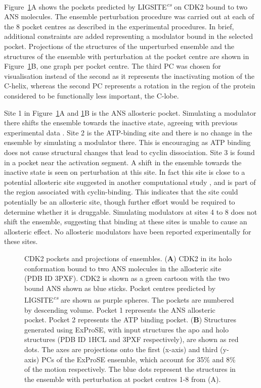 Figure~\ref{fig:cdk}A shows the pockets predicted by LIGSITE\textsuperscript{\it cs} \cite{Huang2006} on CDK2 bound to two ANS molecules.
The ensemble perturbation procedure was carried out at each of the 8 pocket centres as described in the experimental procedures.
In brief, additional constraints are added representing a modulator bound in the selected pocket.
Projections of the structures of the unperturbed ensemble and the structures of the ensemble with perturbation at the pocket centre are shown in Figure~\ref{fig:cdk}B, one graph per pocket centre.
The third PC was chosen for visualisation instead of the second as it represents the inactivating motion of the C-helix, whereas the second PC represents a rotation in the region of the protein considered to be functionally less important, the C-lobe.

Site 1 in Figure~\ref{fig:cdk}A and \ref{fig:cdk}B is the ANS allosteric pocket.
Simulating a modulator there shifts the ensemble towards the inactive state, agreeing with previous experimental data \cite{Betzi2011}.
Site 2 is the ATP-binding site and there is no change in the ensemble by simulating a modulator there.
This is encouraging as ATP binding does not cause structural changes that lead to cyclin dissociation.
Site 3 is found in a pocket near the activation segment.
A shift in the ensemble towards the inactive state is seen on perturbation at this site.
In fact this site is close to a potential allosteric site suggested in another computational study \cite{Pitt2014}, and is part of the region associated with cyclin-binding.
This indicates that the site could potentially be an allosteric site, though further effort would be required to determine whether it is druggable.
Simulating modulators at sites 4 to 8 does not shift the ensemble, suggesting that binding at these sites is unable to cause an allosteric effect.
No allosteric modulators have been reported experimentally for these sites.


\begin{figure}
\centering


\caption{CDK2 pockets and projections of ensembles.
(\textbf{A}) CDK2 in its holo conformation bound to two ANS molecules in the allosteric site (PDB ID 3PXF).
CDK2 is shown as a green cartoon with the two bound ANS shown as blue sticks.
Pocket centres predicted by LIGSITE\textsuperscript{\it cs} are shown as purple spheres.
The pockets are numbered by descending volume.
Pocket 1 represents the ANS allosteric pocket.
Pocket 2 represents the ATP binding pocket.
(\textbf{B}) Structures generated using ExProSE, with input structures the apo and holo structures (PDB ID 1HCL and 3PXF respectively), are shown as red dots.
The axes are projections onto the first (x-axis) and third (y-axis) PCs of the ExProSE ensemble, which account for 35\% and 8\% of the motion respectively.
The blue dots represent the structures in the ensemble with perturbation at pocket centres 1-8 from (A).}

\label{fig:cdk}
\end{figure}


